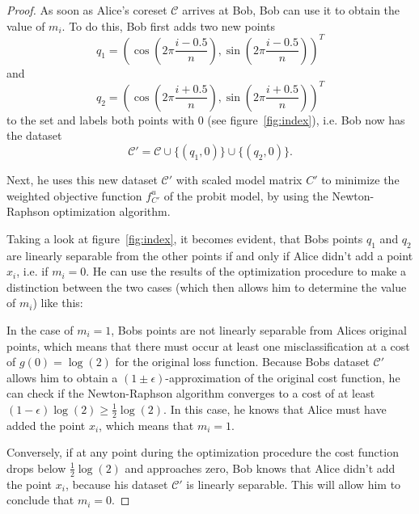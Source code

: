 \begin{proof}
    As soon as Alice's coreset $\mathcal{C}$ arrives at Bob,
    Bob can use it to obtain the value of $m_i$.
    To do this, Bob first adds two new points
    \begin{equation*}
        q_1 = \left( \cos{\left(2 \pi \frac{i - 0.5}{n}\right)},
        \sin{\left(2 \pi \frac{i - 0.5}{n}\right)} \right)^T
    \end{equation*}
    and
    \begin{equation*}
        q_2 = \left( \cos{\left(2 \pi \frac{i + 0.5}{n}\right)},
        \sin{\left(2 \pi \frac{i + 0.5}{n}\right)} \right)^T
    \end{equation*}
    to the set and labels both points with $0$ (see figure~\ref{fig:index}),
    i.e. Bob now has the dataset
    \begin{equation*}
        \mathcal{C}' = \mathcal{C} \cup \{(q_1, 0)\} \cup \{(q_2, 0)\}.
    \end{equation*}

    Next, he uses this new dataset $\mathcal{C}'$ with
    scaled model matrix $C'$ to
    minimize the weighted objective function
    $f_{C'}^u$ of the probit model,
    by using the Newton-Raphson optimization algorithm.

    Taking a look at figure~\ref{fig:index}, it becomes evident,
    that Bobs points $q_1$ and $q_2$ are linearly separable from
    the other points if and only if Alice didn't add a point
    $x_i$, i.e. if $m_i = 0$.
    He can use the results of the optimization procedure to
    make a distinction between the two cases
    (which then allows him to determine the value of $m_i$)
    like this:

    In the case of $m_i=1$, Bobs points are not linearly separable from
    Alices original points, which means that there must occur at least one
    misclassification at a cost of $g(0) = \log(2)$ for the original
    loss function.
    Because Bobs dataset $\mathcal{C}'$ allows him to obtain a
    $(1 \pm \epsilon)$-approximation of the original cost function, he can
    check if the Newton-Raphson algorithm converges to
    a cost of at least $(1 - \epsilon) \log(2) \geq \frac{1}{2} \log(2)$.
    In this case, he knows that Alice must have added the point $x_i$,
    which means that $m_i=1$.

    Conversely, if at any point during the optimization procedure
    the cost function drops below
    $\frac{1}{2} \log(2)$
    and approaches zero, Bob knows that Alice didn't add the point
    $x_i$, because his dataset $\mathcal{C}'$ is linearly separable.
    This will allow him to conclude that $m_i = 0$.


\end{proof}
